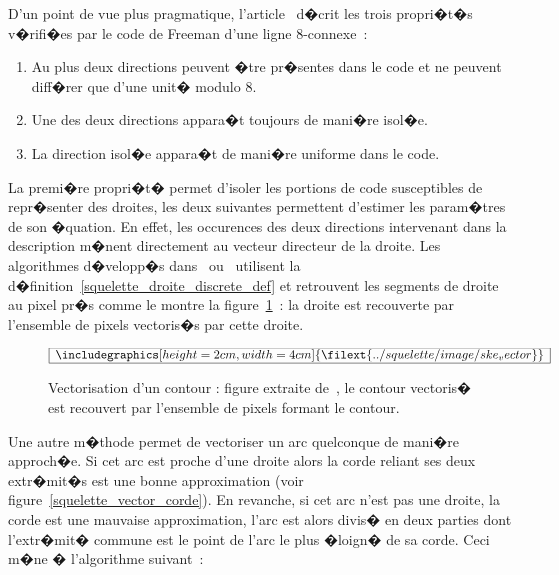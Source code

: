 D'un point de vue plus pragmatique, l'article~ d�crit les trois propri�t�s v�rifi�es par le code de Freeman d'une ligne $8$-connexe~:


            \begin{enumerate}
            \item Au plus deux directions peuvent �tre pr�sentes dans le code et ne peuvent diff�rer que d'une
                        unit� modulo $8$.
            \item Une des deux directions appara�t toujours de mani�re isol�e.
            \item La direction isol�e appara�t de mani�re uniforme dans le code.
            \end{enumerate}

La premi�re propri�t� permet d'isoler les portions de code susceptibles de repr�senter des droites, les deux suivantes permettent d'estimer les param�tres de son �quation. En effet, les occurences des deux directions intervenant dans la description m�nent directement au vecteur directeur de la droite. Les algorithmes d�velopp�s dans~ ou~ utilisent la d�finition~\ref{squelette_droite_discrete_def} et retrouvent les segments de droite au pixel pr�s comme le montre la figure~\ref{squelette_vector}~: la droite est recouverte par l'ensemble de pixels vectoris�s par cette droite.


            \begin{figure}[ht]
        $$\frame{$\begin{array}[c]{c}\includegraphics[height=2cm, width=4cm]
        {\filext{../squelette/image/ske_vector}}\end{array}$}$$
        \caption{    Vectorisation d'un contour : figure extraite de~, le contour vectoris�
                            est recouvert par l'ensemble de pixels formant le contour. }
        \label{squelette_vector}
            \end{figure}


Une autre m�thode permet de vectoriser un arc quelconque de mani�re approch�e. Si cet arc est proche d'une droite alors la corde reliant ses deux extr�mit�s est une bonne approximation (voir figure~\ref{squelette_vector_corde}). En revanche, si cet arc n'est pas une droite, la corde est une mauvaise approximation, l'arc est alors divis� en deux parties dont l'extr�mit� commune est le point de l'arc le plus �loign� de sa corde. Ceci m�ne � l'algorithme suivant~:


